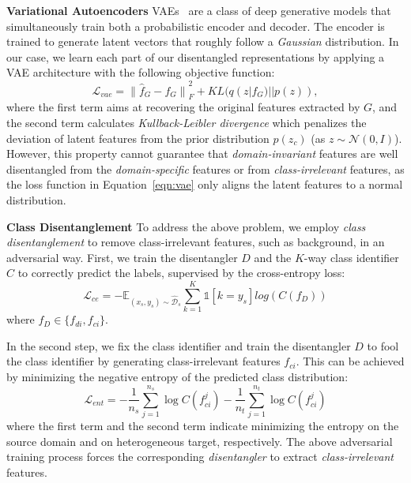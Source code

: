 \documentclass{article}
\begin{document}
\textbf{Variational Autoencoders} VAEs~\cite{vae} are a class of deep generative models that simultaneously train both a probabilistic encoder and decoder. The encoder is trained to generate latent vectors that roughly follow a \textit{Gaussian} distribution. 
In our case, we learn each part of our disentangled representations by applying a VAE architecture with the following objective function:
\begin{equation} 
\label{eqn:vae}
\mathcal{L}_{vae} = {\lVert \widehat{f}_G - f_G \rVert}_{F}^{2} +KL(q(z|f_G)||p(z)), 
\end{equation}
where the first term aims at recovering the original features extracted by $G$, and the second term calculates \textit{Kullback-Leibler divergence} which penalizes the deviation of latent features from the prior distribution $p(z_c)$ (as $z \sim \mathcal{N}(0,I)$). However, this property cannot guarantee that \textit{domain-invariant} features are well disentangled from the \textit{domain-specific} features or from \textit{class-irrelevant} features, as the loss function in Equation~\ref{eqn:vae} only aligns the latent features to a normal distribution. 


\textbf{Class Disentanglement} To address the above problem, we employ \textit{class disentanglement} to remove class-irrelevant features, such as background, in an adversarial way.
First, we train the disentangler $D$ and the $K$-way class identifier $C$ to correctly predict the labels, supervised by the cross-entropy loss:
\begin{equation}
    \mathcal{L}_{ce} = -\mathbb{E}_{(x_s,y_s)\sim\widehat{\mathcal{D}}_s} \sum_{k=1}^{K}\mathds{1} [k=y_s]log(C(f_D))
    \label{equ_cross_entropy}
\end{equation}
where $f_D\in\{f_{di}, f_{ci}\}$.




In the second step, we fix the class identifier and train the disentangler $D$ to fool the class identifier by generating class-irrelevant features $f_{ci}$. This can be achieved by minimizing the negative entropy of the 
predicted class distribution:
\begin{equation}
\mathcal{L}_{ent} = - \frac{1}{n_s} \sum_{j=1}^{n_s} \log C(f^j_{ci}) - \frac{1}{n_t} \sum_{j=1}^{n_t} \log C(f^j_{ci})
\label{equ_entropy_loss}
\end{equation}
where the first term and the second term indicate minimizing the entropy on the source domain and on heterogeneous target, respectively. 
The above adversarial training process forces the corresponding \textit{disentangler} to extract \textit{class-irrelevant} features. 
\end{document}
